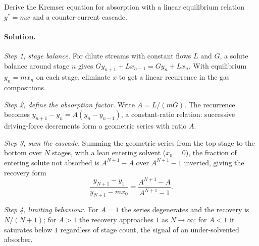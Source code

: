 \begin{exercise}
Derive the Kremser equation for absorption with a linear equilibrium
relation $y^* = mx$ and a counter-current cascade.

\paragraph{Solution.}
\textit{Step 1, stage balance.} For dilute streams with constant flows
$L$ and $G$, a solute balance around stage $n$ gives $G y_{n+1} + L
x_{n-1} = G y_n + L x_n$. With equilibrium $y_n = m x_n$ on each stage,
eliminate $x$ to get a linear recurrence in the gas compositions.

\textit{Step 2, define the absorption factor.} Write $A = L/(mG)$. The
recurrence becomes $y_{n+1} - y_n = A(y_n - y_{n-1})$, a constant-ratio
relation: successive driving-force decrements form a geometric series
with ratio $A$.

\textit{Step 3, sum the cascade.} Summing the geometric series from the
top stage to the bottom over $N$ stages, with a lean entering solvent
($x_0 = 0$), the fraction of entering solute not absorbed is
$A^{N+1}-A$ over $A^{N+1}-1$ inverted, giving the recovery form
\[
\frac{y_{N+1}-y_1}{y_{N+1}-m x_0} = \frac{A^{N+1}-A}{A^{N+1}-1}.
\]

\textit{Step 4, limiting behaviour.} For $A = 1$ the series degenerates
and the recovery is $N/(N+1)$; for $A>1$ the recovery approaches $1$ as
$N\to\infty$; for $A<1$ it saturates below $1$ regardless of stage
count, the signal of an under-solvented absorber.
\end{exercise}

